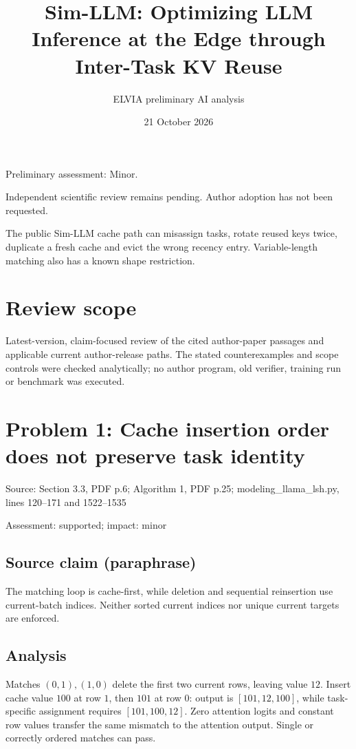 \documentclass[11pt]{article}
\begin{document}
\title{Sim-LLM: Optimizing LLM Inference at the Edge through Inter-Task KV Reuse}

\author{ELVIA preliminary AI analysis}\date{21 October 2026}\maketitle

Preliminary assessment: Minor.\par

Independent scientific review remains pending. Author adoption has not been requested.

The public Sim-LLM cache path can misassign tasks, rotate reused keys twice, duplicate a fresh cache and evict the wrong recency entry. Variable-length matching also has a known shape restriction.

\section*{Review scope}

Latest-version, claim-focused review of the cited author-paper passages and applicable current author-release paths. The stated counterexamples and scope controls were checked analytically; no author program, old verifier, training run or benchmark was executed.

\section*{Problem 1: Cache insertion order does not preserve task identity}

Source: Section 3.3, PDF p.6; Algorithm 1, PDF p.25; modeling\_llama\_lsh.py, lines 120–171 and 1522–1535

Assessment: supported; impact: minor

\subsection*{Source claim (paraphrase)}

The matching loop is cache-first, while deletion and sequential reinsertion use current-batch indices. Neither sorted current indices nor unique current targets are enforced.

\subsection*{Analysis}

Matches \((0,1),(1,0)\) delete the first two current rows, leaving value \(12\). Insert cache value \(100\) at row \(1\), then \(101\) at row \(0\): output is \([101,12,100]\), while task-specific assignment requires \([101,100,12]\). Zero attention logits and constant row values transfer the same mismatch to the attention output. Single or correctly ordered matches can pass.
\end{document}

